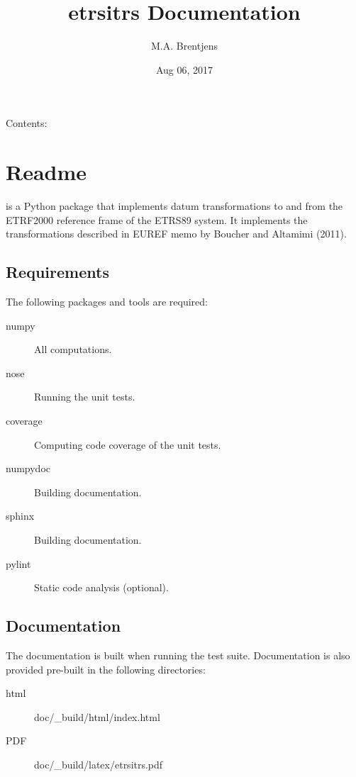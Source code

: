 \documentclass[a4paper,10pt,english]{sphinxmanual}
\title{etrsitrs Documentation}
\date{Aug 06, 2017}
\author{M.A. Brentjens}
\begin{document}
\maketitle
\sphinxtableofcontents
{}\label{\detokenize{index::doc}}


Contents:


\chapter{Readme}
\label{\detokenize{readme:etrsitrs}}\label{\detokenize{readme:readme}}\label{\detokenize{readme::doc}}
 is a Python package that implements datum transformations
to and from the ETRF2000 reference frame of the ETRS89 system. It
implements the transformations described in EUREF memo  by
Boucher and Altamimi (2011).


\section{Requirements}
\label{\detokenize{readme:requirements}}
The following packages and tools are required:
\begin{description}
\item[{numpy}] \leavevmode
All computations.

\item[{nose}] \leavevmode
Running the unit tests.

\item[{coverage}] \leavevmode
Computing code coverage of the unit tests.

\item[{numpydoc}] \leavevmode
Building documentation.

\item[{sphinx}] \leavevmode
Building documentation.

\item[{pylint}] \leavevmode
Static code analysis (optional).

\end{description}


\section{Documentation}
\label{\detokenize{readme:documentation}}
The documentation is built when running the test suite. Documentation
is also provided pre-built in the following directories:
\begin{description}
\item[{html}] \leavevmode
doc/\_build/html/index.html

\item[{PDF}] \leavevmode
doc/\_build/latex/etrsitrs.pdf

\end{description}
\end{document}
